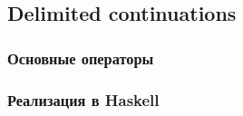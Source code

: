 

\subsection{Delimited continuations}

\cite{dyvbig2007monadic}


\subsubsection{Основные операторы}


\subsubsection{Реализация в Haskell}






































